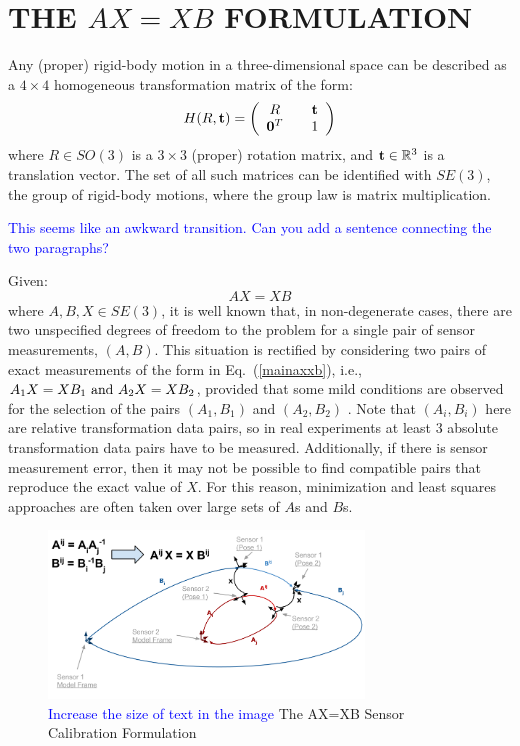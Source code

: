 \documentclass[twocolumn,10pt]{asme2ej}
\newcommand{\ttt}{{\bf t}}
\begin{document}
\section{THE $AX=XB$ FORMULATION}
\label{Formulation}
\noindent Any (proper) rigid-body motion in a three-dimensional space can be described as a $4 \times 4$ homogeneous transformation matrix of the form: 
\begin{equation} 
H(R, \ttt) = \left(
\begin{array}{ccc}
R && {\bf t} \\
{\bf 0}^T && 1 
\end{array} 
\right)
\label{homotrans} 
\end{equation}
where $R \in SO(3)$ is a $3\times 3$ (proper) rotation matrix, and ${\bf t} \in \mathbb{R}^3$ is a translation vector. The set of all such matrices can be identified with $SE(3)$, the group of rigid-body motions, where the group law is matrix multiplication.

\textcolor{blue}{This seems like an awkward transition. Can you add a sentence connecting the two paragraphs?}

Given:
\begin{equation}
A X = X B
\label{mainaxxb}
\end{equation}
where $A,  B, X \in SE(3)$, it is well known that, in non-degenerate cases, there are two unspecified degrees of freedom to the problem for a single pair of sensor measurements, $(A,B)$. This situation is rectified by considering two pairs of exact measurements of the form in Eq.~(\ref{mainaxxb}), i.e., $ {A_1}X=X{B_1} {\rm \,\, and \,\,} {A_2}X = X{B_2} $, provided that some mild conditions are observed for the selection of the pairs $(A_1,B_1)$ and $(A_2,B_2)$ \cite{chen91,park1994robot,shiu1989calibration}. Note that $(A_i, B_i)$ here are relative transformation data pairs, so in real experiments at least 3 absolute transformation data pairs have to 
be measured. Additionally, if there is sensor measurement error, then it may not be possible to find compatible pairs that reproduce the exact value of $X$. For this reason, minimization and least squares approaches are often taken over large sets of $A$s and $B$s.

\begin{figure}[t]
\includegraphics[width=3.3in]{figure/AX=XB(ASME)_v1.png}
\centering
\caption{\textcolor{blue}{Increase the size of text in the image} The AX=XB Sensor Calibration Formulation}
\label{AXXBfig1}
\end{figure}
\end{document}
